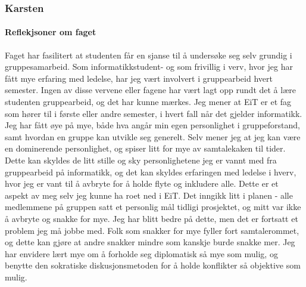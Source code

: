 \subsubsection{Karsten}

\paragraph{Reflekjsoner om faget}
Faget har fasilitert at studenten får en sjanse til å undersøke seg selv grundig i gruppesamarbeid. Som informatikkstudent- og som frivillig i verv, hvor jeg har fått mye erfaring med ledelse, har jeg vært involvert i gruppearbeid hvert semester. Ingen av disse vervene eller fagene har vært lagt opp rundt det å lære studenten gruppearbeid, og det har kunne mærkes. Jeg mener at EiT er et fag som hører til i første eller andre semester, i hvert fall når det gjelder informatikk. Jeg har fått øye på mye, både hva angår min egen personlighet i gruppeforstand, samt hvordan en gruppe kan utvikle seg generelt. Selv mener jeg at jeg kan være en dominerende personlighet, og spiser litt for mye av samtalekaken til tider. Dette kan skyldes de litt stille og sky personlighetene jeg er vannt med fra gruppearbeid på informatikk, og det kan skyldes erfaringen med ledelse i hverv, hvor jeg er vant til å avbryte for å holde flyte og inkludere alle. Dette er et aspekt av meg selv jeg kunne ha roet ned i EiT. Det inngikk litt i planen - alle medlemmene på gruppen satt et personlig mål tidligi prosjektet, og mitt var ikke å avbryte og snakke for mye. Jeg har blitt bedre på dette, men det er fortsatt et problem jeg må jobbe med. Folk som snakker for mye fyller fort samtalerommet, og dette kan gjøre at andre snakker mindre som kanskje burde snakke mer. Jeg har envidere lært mye om å forholde seg diplomatisk så mye som mulig, og benytte den sokratiske diskusjonsmetoden for å holde konflikter så objektive som mulig. 
